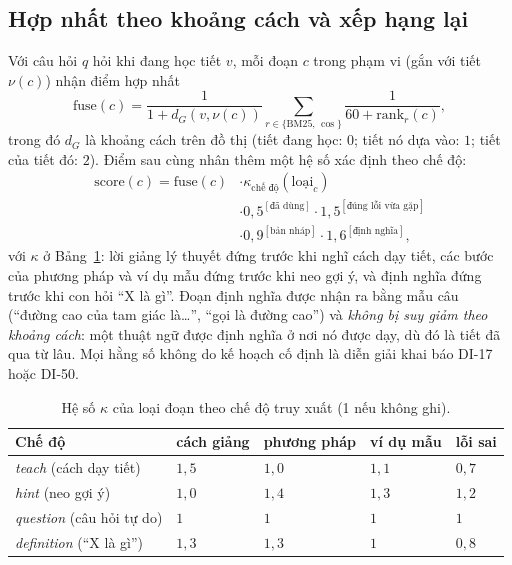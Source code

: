 \subsection{Hợp nhất theo khoảng cách và xếp hạng lại}
Với câu hỏi $q$ hỏi khi đang học tiết $v$, mỗi đoạn $c$ trong phạm vi (gắn với tiết $\nu(c)$) nhận điểm hợp nhất
\begin{equation}
\mathrm{fuse}(c)=\frac{1}{1+d_G(v,\nu(c))}\sum_{r\in\{\mathrm{BM25},\,\cos\}}\frac{1}{60+\mathrm{rank}_r(c)},
\label{eq:fuse}
\end{equation}
trong đó $d_G$ là khoảng cách trên đồ thị (tiết đang học: $0$; tiết nó dựa vào: $1$; tiết của tiết đó: $2$). Điểm sau cùng nhân thêm một hệ số xác định theo chế độ:
\begin{equation}
\begin{split}
\mathrm{score}(c)=\mathrm{fuse}(c)&\cdot\kappa_{\text{chế độ}}(\text{loại}_c)\\
&\cdot 0{,}5^{[\text{đã dùng}]}\cdot 1{,}5^{[\text{đúng lỗi vừa gặp}]}\\
&\cdot 0{,}9^{[\text{bản nháp}]}\cdot 1{,}6^{[\text{định nghĩa}]},
\end{split}
\end{equation}
với $\kappa$ ở Bảng~\ref{tab:kind}: lời giảng lý thuyết đứng trước khi nghĩ cách dạy tiết, các bước của phương pháp và ví dụ mẫu đứng trước khi neo gợi ý, và định nghĩa đứng trước khi con hỏi ``X là gì''. Đoạn định nghĩa được nhận ra bằng mẫu câu (``đường cao của tam giác là\dots'', ``gọi là đường cao'') và \emph{không bị suy giảm theo khoảng cách}: một thuật ngữ được định nghĩa ở nơi nó được dạy, dù đó là tiết đã qua từ lâu. Mọi hằng số không do kế hoạch cố định là diễn giải khai báo DI-17 hoặc DI-50.

\begin{table}[tbp]
\centering
\caption{Hệ số $\kappa$ của loại đoạn theo chế độ truy xuất (1 nếu không ghi).}
\label{tab:kind}
\footnotesize
\begin{tabular}{@{}>{\raggedright\arraybackslash}p{2.4cm}>{\raggedleft\arraybackslash}p{1.0cm}>{\raggedleft\arraybackslash}p{1.3cm}>{\raggedleft\arraybackslash}p{1.0cm}>{\raggedleft\arraybackslash}p{0.9cm}@{}}
\toprule
Chế độ & cách giảng & phương pháp & ví dụ mẫu & lỗi sai \\
\midrule
\emph{teach} (cách dạy tiết) & $1{,}5$ & $1{,}0$ & $1{,}1$ & $0{,}7$ \\
\emph{hint} (neo gợi ý) & $1{,}0$ & $1{,}4$ & $1{,}3$ & $1{,}2$ \\
\emph{question} (câu hỏi tự do) & $1$ & $1$ & $1$ & $1$ \\
\emph{definition} (``X là gì'') & $1{,}3$ & $1{,}3$ & $1$ & $0{,}8$ \\
\bottomrule
\end{tabular}
\end{table}

